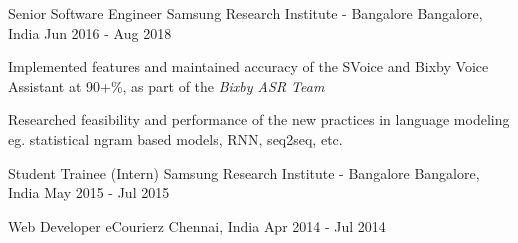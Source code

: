 

\begin{cventries}

  \cventry
    {Senior Software Engineer} %
    {Samsung Research Institute - Bangalore} %
    {Bangalore, India} %
    {Jun 2016 - Aug 2018} %
    {
      \begin{cvitems}
      \item{Implemented features and maintained accuracy of the SVoice and Bixby Voice Assistant at 90+\%, as part of the \textit{Bixby ASR Team}}
      \item{Researched feasibility and performance of the new practices in language modeling eg. statistical ngram based models, RNN, seq2seq, etc.}
      \end{cvitems}
    }

  \cventry
    {Student Trainee (Intern)} %
    {Samsung Research Institute - Bangalore} %
    {Bangalore, India} %
    {May 2015 - Jul 2015} %
    {
    }

  \cventry
    {Web Developer} %
    {eCourierz} %
    {Chennai, India} %
    {Apr 2014 - Jul 2014} %
    {
    }


\end{cventries}

